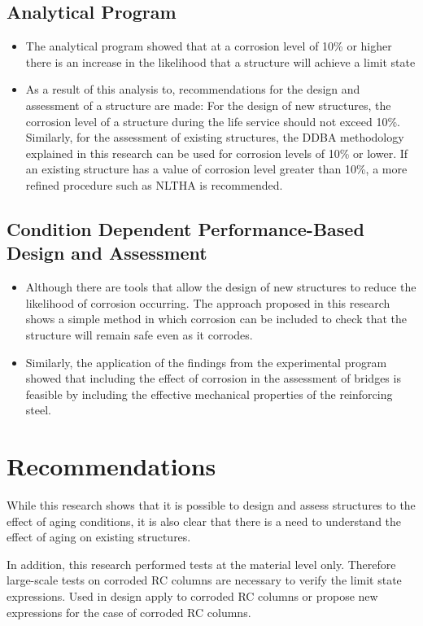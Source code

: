 \subsection{Analytical Program}
\begin{itemize}
    \item The analytical program showed that at a corrosion level of 10\% or higher there is an increase in the likelihood that a structure will achieve a limit state
    \item As a result of this analysis to, recommendations for the design and assessment of a structure are made: For the design of new structures, the corrosion level of a structure during the life service should not exceed 10\%. Similarly, for the assessment of existing structures, the DDBA methodology explained in this research can be used for corrosion levels of 10\% or lower. If an existing structure has a value of corrosion level greater than 10\%, a more refined procedure such as NLTHA is recommended.
\end{itemize}

\subsection{Condition Dependent Performance-Based Design and Assessment}
\begin{itemize}
    \item Although there are tools that allow the design of new structures to reduce the likelihood of corrosion occurring. The approach proposed in this research shows a simple method in which corrosion can be included to check that the structure will remain safe even as it corrodes.
    \item Similarly, the application of the findings from the experimental program showed that including the effect of corrosion in the assessment of bridges is feasible by including the effective mechanical properties of the reinforcing steel.
\end{itemize}

\section{Recommendations}

While this research shows that it is possible to design and assess structures to the effect of aging conditions, it is also clear that there is a need to understand the effect of aging on existing structures.

In addition, this research performed tests at the material level only. Therefore large-scale tests on corroded RC columns are necessary to verify the limit state expressions. Used in design apply to corroded RC columns or propose new expressions for the case of corroded RC columns. 

